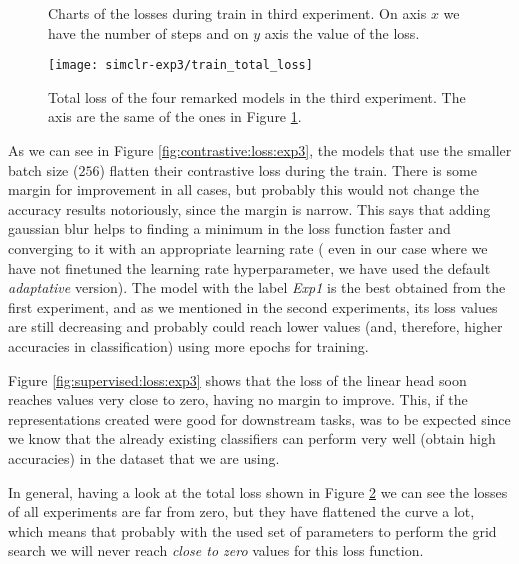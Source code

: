 \begin{figure}[htp] 
    \centering
    \hfill%
        \caption{Charts of the losses during train in third experiment. On axis $x$ we have the number of steps and on $y$ axis the value of the loss.}
        \label{fig:exp3:both:losses}
\end{figure}

\begin{figure}[H]
    \centering
    \texttt{[image: simclr-exp3/train\_total\_loss]}%
    \caption{Total loss of the four remarked models in the third experiment. The axis are the same of the ones in Figure \ref{fig:exp3:both:losses}. }
    \label{fig:total:loss:exp3}%
    \end{figure}

As we can see in Figure \ref{fig:contrastive:loss:exp3}, the models that use the smaller batch size ($256$) flatten their contrastive loss during the train. There is some margin for improvement in all cases, but probably this would not change the accuracy results notoriously, since the margin is narrow. This says that adding gaussian blur helps to finding a minimum in the loss function faster and converging to it with an appropriate learning rate ( even in our case where we have not finetuned the learning rate hyperparameter, we have used the default \emph{adaptative} version). The model with the label \emph{Exp1} is the best obtained from the first experiment, and as we mentioned in the second experiments, its loss values are still decreasing and probably could reach lower values (and, therefore, higher accuracies in classification) using more epochs for training.

Figure \ref{fig:supervised:loss:exp3} shows that the loss of the linear head soon reaches values very close to zero, having no margin to improve. This, if the representations created were good for downstream tasks, was to be expected since we know that the already existing  classifiers can perform very well (obtain high accuracies) in the dataset that we are using.

In general, having a look at the total loss shown in Figure \ref{fig:total:loss:exp3} we can see the losses of all experiments are far from zero, but they have flattened the curve a lot, which means that probably with the used set of parameters to perform the grid search we will never reach \emph{close to zero} values for this loss function.

